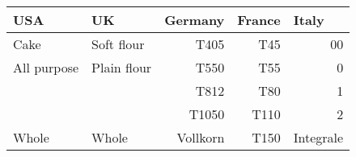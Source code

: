 


\begin{tabular}{|l|l|r|r|r|}
\hline
\textbf{USA}      & \textbf{UK}      & \multicolumn{1}{l|}{\textbf{Germany}}      & \multicolumn{1}{l|}{\textbf{France}}      & \multicolumn{1}{l|}{\textbf{Italy}} \\ \hline
Cake              & Soft flour       & T405                                       & T45                                       & 00                                       \\ \hline
All purpose       & Plain flour      & T550                                       & T55                                       & 0                                        \\ \hline
                  &                  & T812                                       & T80                                       & 1                                        \\ \hline
                  &                  & T1050                                      & T110                                      & 2                                        \\ \hline
Whole             & Whole            & Vollkorn                                   & T150                                      & Integrale                                \\ \hline
\end{tabular}

